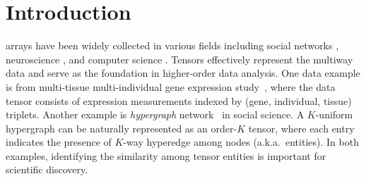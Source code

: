 \documentclass[lettersize,onecolumn,journal]{IEEEtran}
\theoremstyle{definition}
\theoremstyle{definition}
\def\fixme#1#2{\textbf{\color{red}[FIXME (#1): #2]}}
\begin{document}


    










\section{Introduction}\label{sec:intro}


 arrays have been widely collected in various fields including social networks \citep{anandkumar2014tensor}, neuroscience \citep{wang2017bayesian}, and computer science \citep{koniusz2016sparse}. Tensors effectively represent the multiway data and serve as the foundation in higher-order data analysis. One data example is from multi-tissue multi-individual gene expression study~\citep{wang2019three,hore2016tensor}, where the data tensor consists of expression measurements indexed by (gene, individual, tissue) triplets. Another example is \emph{hypergraph} network~\citep{ghoshdastidar2017uniform,ghoshdastidar2017consistency,ahn2019community,ke2019community} in social science. A $K$-uniform hypergraph can be naturally represented as an order-$K$ tensor, where each entry indicates the presence of $K$-way hyperedge among nodes (a.k.a.\ entities). In both examples, identifying the similarity among tensor entities is important for scientific discovery. 
\end{document}

